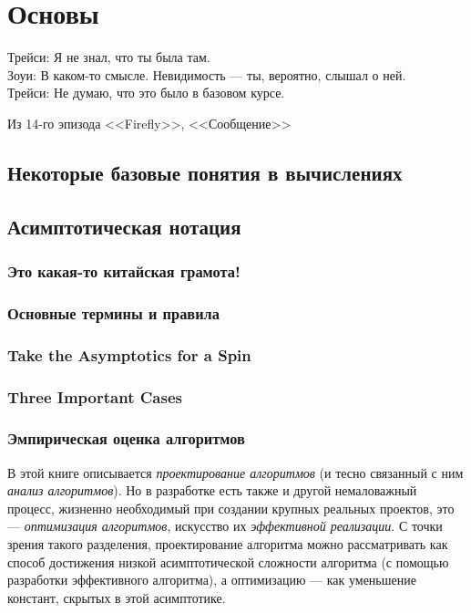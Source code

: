 \chapter{Основы}
\label{chap:basics}

\epigraph{Трейси: Я не знал, что ты была там.\\
Зоуи: В каком-то смысле. Невидимость — ты, вероятно, слышал о ней.\\
Трейси: Не думаю, что это было в базовом курсе.
}{Из 14-го эпизода <<Firefly>>, <<Сообщение>>}



\section{Некоторые базовые понятия в вычислениях}

\section{Асимптотическая нотация}
\subsection{Это какая-то китайская грамота!}
\subsection{Основные термины и правила}
\subsection{Take the Asymptotics for a Spin }
\subsection{Three Important Cases}
\subsection{Эмпирическая оценка алгоритмов}
\label{sec:empirical-evaluation}

В этой книге описывается\textit{ проектирование алгоритмов} (и тесно связанный с ним\textit{ анализ алгоритмов}). Но в разработке есть также и другой немаловажный процесс, жизненно необходимый при создании крупных реальных проектов, это — \textit{оптимизация алгоритмов}, искусство их \textit{эффективной реализации}. С точки зрения такого разделения, проектирование алгоритма можно рассматривать как способ достижения низкой асимптотической сложности алгоритма (с помощью разработки эффективного алгоритма), а оптимизацию — как уменьшение констант, скрытых в этой асимптотике.

